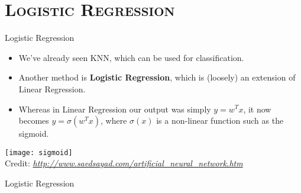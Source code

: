 \section{\scshape Logistic Regression}
\begin{frame}{Logistic Regression}
\begin{itemize}
\item We've already seen KNN, which can be used for classification.
\item Another method is \textbf{Logistic Regression}, which is (loosely) an extension of Linear Regression.
\item Whereas in Linear Regression our output was simply $y = w^Tx$, it now becomes $y = \sigma\left(w^Tx\right)$, where $\sigma(x)$ is a non-linear function such as the sigmoid.
\end{itemize}
\begin{center}
\texttt{[image: sigmoid]}\\[-1ex]
{\tiny Credit: {\itshape \url{http://www.saedsayad.com/artificial_neural_network.htm}}}
\end{center}
\end{frame}

\begin{frame}{Logistic Regression}
\begin{center}
\end{center}
\end{frame}




